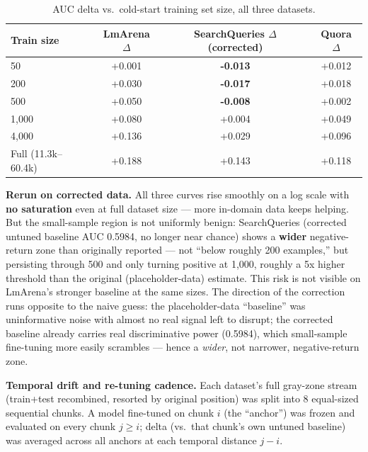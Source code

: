\documentclass[11pt]{article}
\newenvironment{fittab}{\begin{lrbox}{\fittabbox}}{\end{lrbox}%
  \ifdim\wd\fittabbox>\linewidth\resizebox{\linewidth}{!}{\usebox{\fittabbox}}\else\usebox{\fittabbox}\fi}
\begin{document}
\begin{table}[h]
\centering
\small
\begin{fittab}\begin{tabular}{@{}lccc@{}}
\toprule
\textbf{Train size} & \textbf{LmArena $\Delta$} & \textbf{SearchQueries $\Delta$ (corrected)} & \textbf{Quora $\Delta$} \\
\midrule
50 & +0.001 & \textbf{-0.013} & +0.012 \\
200 & +0.030 & \textbf{-0.017} & +0.018 \\
500 & +0.050 & \textbf{-0.008} & +0.002 \\
1{,}000 & +0.080 & +0.004 & +0.049 \\
4{,}000 & +0.136 & +0.029 & +0.096 \\
Full (11.3k--60.4k) & +0.188 & +0.143 & +0.118 \\
\bottomrule
\end{tabular}\end{fittab}
\caption{AUC delta vs.\ cold-start training set size, all three datasets.}
\end{table}

\textbf{Rerun on corrected data.} All three curves rise smoothly on a log scale with \textbf{no saturation} even at full dataset size --- more in-domain data keeps helping. But the small-sample region is not uniformly benign: SearchQueries (corrected untuned baseline AUC 0.5984, no longer near chance) shows a \textbf{wider} negative-return zone than originally reported --- not ``below roughly 200 examples,'' but persisting through 500 and only turning positive at 1{,}000, roughly a 5x higher threshold than the original (placeholder-data) estimate. This risk is not visible on LmArena's stronger baseline at the same sizes. The direction of the correction runs opposite to the naive guess: the placeholder-data ``baseline'' was uninformative noise with almost no real signal left to disrupt; the corrected baseline already carries real discriminative power (0.5984), which small-sample fine-tuning more easily scrambles --- hence a \emph{wider}, not narrower, negative-return zone.

\textbf{Temporal drift and re-tuning cadence.} Each dataset's full gray-zone stream (train+test recombined, resorted by original position) was split into 8 equal-sized sequential chunks. A model fine-tuned on chunk $i$ (the ``anchor'') was frozen and evaluated on every chunk $j \geq i$; delta (vs.\ that chunk's own untuned baseline) was averaged across all anchors at each temporal distance $j-i$.
\end{document}

